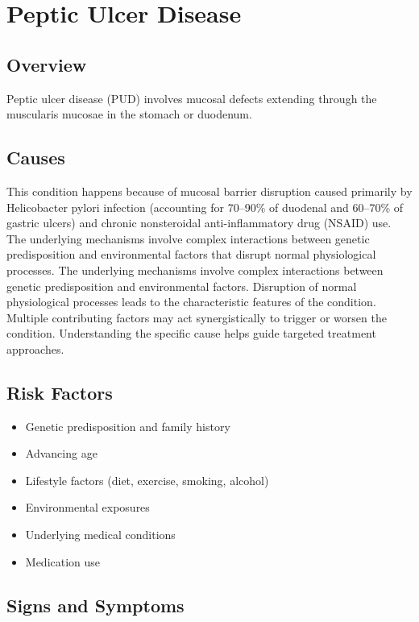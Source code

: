 \chapter{Peptic Ulcer Disease}
\label{sec:Peptic Ulcer Disease}

\section{Overview}
Peptic ulcer disease (PUD) involves mucosal defects extending through the muscularis mucosae in the stomach or duodenum.
\section{Causes}
This condition happens because of mucosal barrier disruption caused primarily by Helicobacter pylori infection (accounting for 70--90\% of duodenal and 60--70\% of gastric ulcers) and chronic nonsteroidal anti-inflammatory drug (NSAID) use. The underlying mechanisms involve complex interactions between genetic predisposition and environmental factors that disrupt normal physiological processes. The underlying mechanisms involve complex interactions between genetic predisposition and environmental factors. Disruption of normal physiological processes leads to the characteristic features of the condition. Multiple contributing factors may act synergistically to trigger or worsen the condition. Understanding the specific cause helps guide targeted treatment approaches.
\section{Risk Factors}


\begin{itemize}[noitemsep]
  \item Genetic predisposition and family history
  \item Advancing age
  \item Lifestyle factors (diet, exercise, smoking, alcohol)
  \item Environmental exposures
  \item Underlying medical conditions
  \item Medication use
\end{itemize}
\section{Signs and Symptoms}

